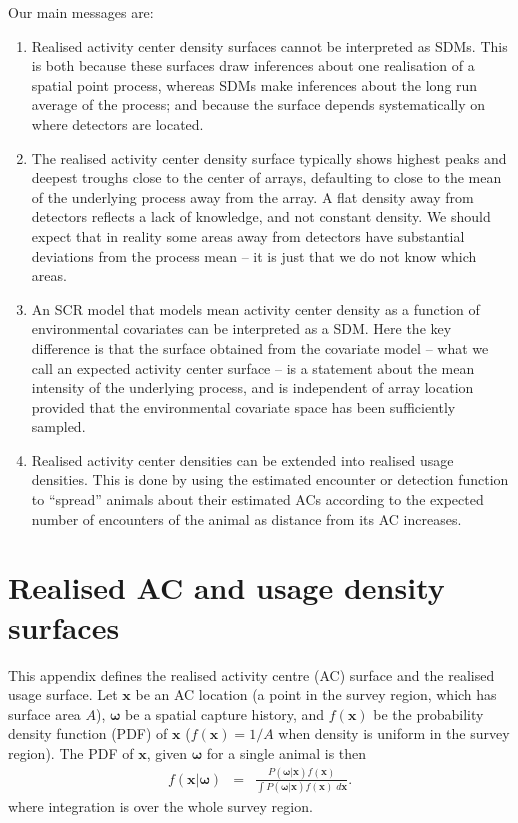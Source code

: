\documentclass[10pt,a4paper]{article}
\begin{document}
Our main messages are:
\begin{enumerate}
\item Realised activity center density surfaces cannot be interpreted as SDMs. This is both because these surfaces draw inferences about one realisation of a spatial point process, whereas SDMs make inferences about the long run average of the process; and because the surface depends systematically on where detectors are located.
\item The realised activity center density surface typically shows highest peaks and deepest troughs close to the center of arrays, defaulting to close to the mean of the underlying process away from the array. A flat density away from detectors reflects a lack of knowledge, and not constant density. We should expect that in reality some areas away from detectors have substantial deviations from the process mean -- it is just that we do not know which areas.

\item An SCR model that models mean activity center density as a function of environmental covariates can be interpreted as a SDM. Here the key difference is that the surface obtained from the covariate model -- what we call an expected activity center surface -- is a statement about the mean intensity of the underlying process, and is independent of array location provided that the environmental covariate space has been sufficiently sampled.

\item Realised activity center densities can be extended into realised usage densities. This is done by using the estimated encounter or detection function to ``spread'' animals about their estimated ACs according to the expected number of encounters of the animal as distance from its AC increases. 
\end{enumerate}





\clearpage
\appendix
\appendixpage
\section{Realised AC and usage density surfaces}
\label{appx:usage-details}

This appendix defines the realised activity centre (AC) surface and the realised usage surface. Let $\bm{x}$ be an AC location (a point in the survey region, which has surface area $A$), $\bm{\omega}$ be a spatial capture history, and $f(\bm{x})$ be the probability density function (PDF) of $\bm{x}$ ($f(\bm{x})=1/A$ when density is uniform in the survey region). The PDF of $\bm{x}$, given $\bm{\omega}$ for a single animal is then
\begin{eqnarray*}
f(\bm{x}|\bm{\omega})&=&\frac{P(\bm{\omega}|\bm{x})f(\bm{x})}{\int P(\bm{\omega}|\bm{x})f(\bm{x})\;d\bm{x}}.
\end{eqnarray*}
\noindent
where integration is over the whole survey region.
\end{document}
